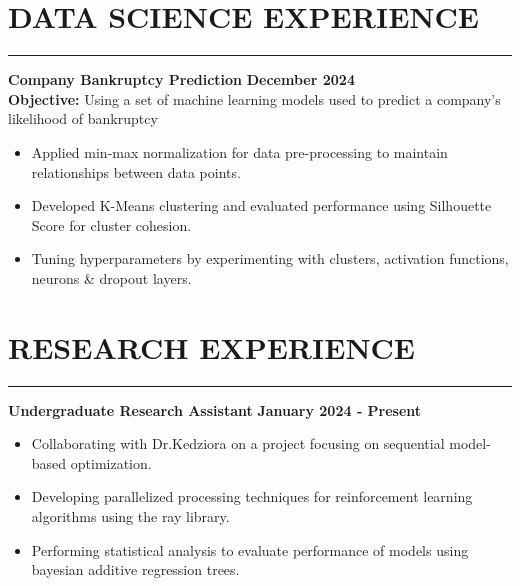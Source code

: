 \documentclass[a4paper, 11pt]{article}
\begin{document}
\section*{DATA SCIENCE EXPERIENCE}
\vspace{-0.2cm}  
\hrule
\vspace{0.2cm}
\textbf{Company Bankruptcy Prediction} \hfill \textbf{December 2024} \\
\textbf{Objective:} Using a set of machine learning models used to predict a company's likelihood
of bankruptcy
\vspace{-0.2cm}
\begin{itemize}[left=0pt]
    \setlength{\itemsep}{-0.2em}
    \item Applied min-max normalization for data pre-processing to maintain relationships between data points.
    \item Developed K-Means clustering and evaluated performance using Silhouette Score for cluster cohesion.
    \item Tuning hyperparameters by experimenting with clusters, activation functions, neurons \& dropout layers.
\end{itemize}

\section*{RESEARCH EXPERIENCE}
\vspace{-0.2cm}  
\hrule
\vspace{0.2cm}
\textbf{Undergraduate Research Assistant} \hfill \textbf{January 2024 - Present}
\vspace{-0.2cm}
\begin{itemize}[left=0pt]
    \setlength{\itemsep}{-0.2em}
    \item Collaborating with Dr.Kedziora on a project focusing on sequential model-based optimization.
    \item Developing parallelized processing techniques for reinforcement learning algorithms using the ray library.
    \item Performing statistical analysis to evaluate performance of models using bayesian additive regression trees.
\end{itemize}
\end{document}
